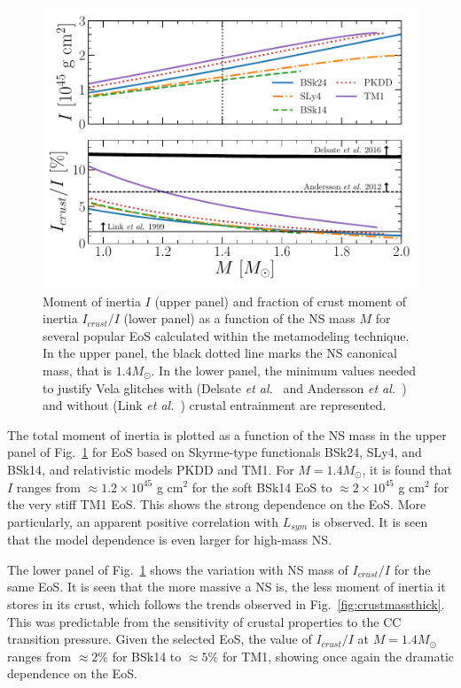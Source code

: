 \begin{figure}[!t]
\begin{center}
  \includegraphics[width=0.9\linewidth]{figures/moi_popular.pdf}
\end{center}
\caption[Moment of inertia and fraction of crust moment of inertia
versus NS mass for several popular EoS]{Moment of
  inertia $I$ (upper panel) and fraction of crust moment of inertia
  $I_{crust}/I$ (lower panel) as a function of the NS mass $M$ for several 
  popular EoS calculated within the metamodeling technique. In the upper panel, 
  the black dotted line marks the NS canonical mass, that is $1.4M_\odot$. In
the lower panel, the minimum values needed to justify Vela glitches with
(Delsate \textit{et al.}~\cite{Delsate2016} and Andersson \textit{et
al.}~\cite{Andersson2012}) and without (Link \textit{et al.}~\cite{Link1999}) 
crustal entrainment are represented.}\label{fig:moi_popular}
\end{figure}

The total moment of inertia is plotted as a function of the NS mass in the
upper panel of Fig.~\ref{fig:moi_popular} for EoS based on Skyrme-type
functionals BSk24, SLy4, and BSk14, and relativistic models PKDD and TM1.
For $M=1.4M_\odot$, it is found that $I$ ranges from $\approx 1.2\times 
10^{45}$ g cm$^2$ for the soft BSk14 EoS to $\approx 2\times 10^{45}$ g cm$^2$ 
for the very stiff TM1 EoS. This shows the strong dependence on the EoS. More 
particularly, an apparent positive correlation with $L_{sym}$ is observed. 
It is seen that the model dependence is even larger for high-mass NS.

The lower panel of Fig.~\ref{fig:moi_popular} shows the variation with NS mass
of $I_{crust}/I$ for the same EoS. It is seen that the more massive a 
NS is, the less moment of inertia it stores in its crust, which follows
the trends observed in Fig.~\ref{fig:crustmassthick}. This was predictable from 
the sensitivity of crustal properties to the CC transition pressure. Given the 
selected EoS, the value of $I_{crust}/I$ at $M=1.4M_\odot$ 
ranges from $\approx 2\%$ for BSk14 to $\approx 5\%$ for TM1, showing once 
again the dramatic dependence on the EoS.

